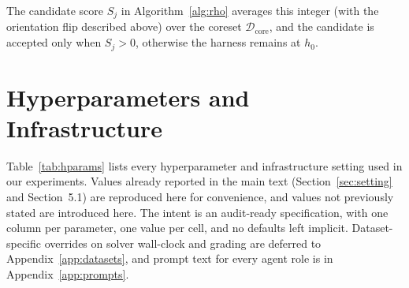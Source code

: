 \documentclass{llmxive}
\providecommand{\linenumbers}{}
\begin{document}
\noindent The candidate score $S_j$ in Algorithm~\ref{alg:rho} averages this
integer (with the orientation flip described above) over the coreset
$\mathcal{D}_{\mathrm{core}}$, and the candidate is accepted only when
$S_j > 0$, otherwise the harness remains at $h_0$.

\linenumbers

\section{Hyperparameters and Infrastructure}\label{app:hyperparameters}

Table~\ref{tab:hparams} lists every hyperparameter and infrastructure setting used in our experiments.
Values already reported in the main text (Section~\ref{sec:setting} and Section~5.1) are reproduced here for convenience, and values not previously stated are introduced here.
The intent is an audit-ready specification, with one column per parameter, one value per cell, and no defaults left implicit.
Dataset-specific overrides on solver wall-clock and grading are deferred to Appendix~\ref{app:datasets}, and prompt text for every agent role is in Appendix~\ref{app:prompts}.
\end{document}
